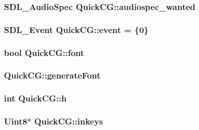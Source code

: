 \hypertarget{namespaceQuickCG_a65b3a8aa3b5ceec9c5bbcee730765075}{
\subsubsection[{audiospec\-\_\-wanted}]{\setlength{\rightskip}{0pt plus 5cm}S\-D\-L\-\_\-\-Audio\-Spec Quick\-C\-G\-::audiospec\-\_\-wanted}}\label{namespaceQuickCG_a65b3a8aa3b5ceec9c5bbcee730765075}
\hypertarget{namespaceQuickCG_a11407295e1307c55e0db667e09055365}{
\subsubsection[{event}]{\setlength{\rightskip}{0pt plus 5cm}S\-D\-L\-\_\-\-Event Quick\-C\-G\-::event = \{0\}}}\label{namespaceQuickCG_a11407295e1307c55e0db667e09055365}
\hypertarget{namespaceQuickCG_a82a95aabb0ab79dafa6c2409d0718434}{
\subsubsection[{font}]{\setlength{\rightskip}{0pt plus 5cm}bool Quick\-C\-G\-::font}}\label{namespaceQuickCG_a82a95aabb0ab79dafa6c2409d0718434}
\hypertarget{namespaceQuickCG_a6d5d49731a3a613a4940d2f0b22a2c55}{
\subsubsection[{generate\-Font}]{ Quick\-C\-G\-::generate\-Font}}\label{namespaceQuickCG_a6d5d49731a3a613a4940d2f0b22a2c55}
\hypertarget{namespaceQuickCG_ae460032287c9d51b4883aa9a6d7906ab}{
\subsubsection[{h}]{\setlength{\rightskip}{0pt plus 5cm}int Quick\-C\-G\-::h}}\label{namespaceQuickCG_ae460032287c9d51b4883aa9a6d7906ab}
\hypertarget{namespaceQuickCG_ad8b8e937433a800f9bd0bf81faff4312}{
\subsubsection[{inkeys}]{\setlength{\rightskip}{0pt plus 5cm}Uint8$\ast$ Quick\-C\-G\-::inkeys}}\label{namespaceQuickCG_ad8b8e937433a800f9bd0bf81faff4312}
